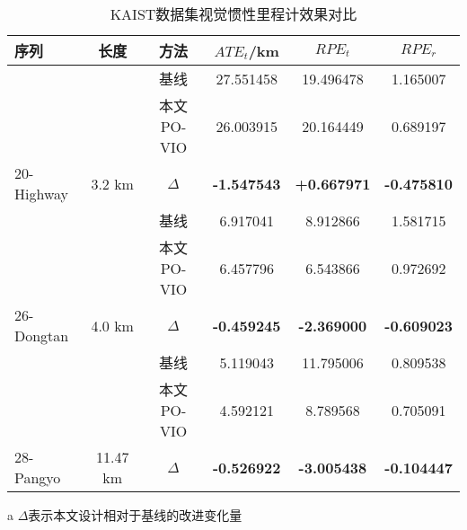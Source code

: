 \begin{table}
\centering
\begin{threeparttable}
\caption{KAIST数据集视觉惯性里程计效果对比}
\begin{tabular}{lccccc}
\toprule
序列                           & 长度                         & 方法         & $ATE_t$/km\textdownarrow{} & $RPE_t$\textdownarrow{}                           & $RPE_r$\textdownarrow{}  \\ \midrule
                              &                            & 基线 & 27.551458   & 19.496478                         & 1.165007 \\
                              &                            & 本文PO-VIO      & 26.003915   & 20.164449                         & 0.689197 \\
\multirow{-3}{*}{20-Highway} & \multirow{-3}{*}{3.2 km}   & $\Delta$ & \cellcolor[HTML]{FFCCC9}\textbf{-1.547543}    & \cellcolor[HTML]{9AFF99}\textbf{+0.667971} & \cellcolor[HTML]{FFCCC9}\textbf{-0.475810} \\ \midrule
                              &                            & 基线 & 6.917041    & 8.912866                          & 1.581715 \\
                              &                            & 本文PO-VIO      & 6.457796    & 6.543866                          & 0.972692 \\
\multirow{-3}{*}{26-Dongtan}   & \multirow{-3}{*}{4.0 km}   & $\Delta$ & \cellcolor[HTML]{FFCCC9}\textbf{-0.459245}    & \cellcolor[HTML]{FFCCC9}\textbf{-2.369000}                          & \cellcolor[HTML]{FFCCC9}\textbf{-0.609023} \\ \midrule
                              &                            & 基线 & 5.119043    & 11.795006                         & 0.809538 \\
                              &                            & 本文PO-VIO      & 4.592121    & 8.789568                          & 0.705091 \\
\multirow{-3}{*}{28-Pangyo}   & \multirow{-3}{*}{11.47 km} & $\Delta$ & \cellcolor[HTML]{FFCCC9}\textbf{-0.526922}    & \cellcolor[HTML]{FFCCC9}\textbf{-3.005438}                          & \cellcolor[HTML]{FFCCC9}\textbf{-0.104447} \\ \bottomrule
\end{tabular}
\label{tab:vio_kaist}
\begin{tablenotes}
  \item [a] $\Delta$表示本文设计相对于基线的改进变化量
\end{tablenotes}
\end{threeparttable}
\end{table}

